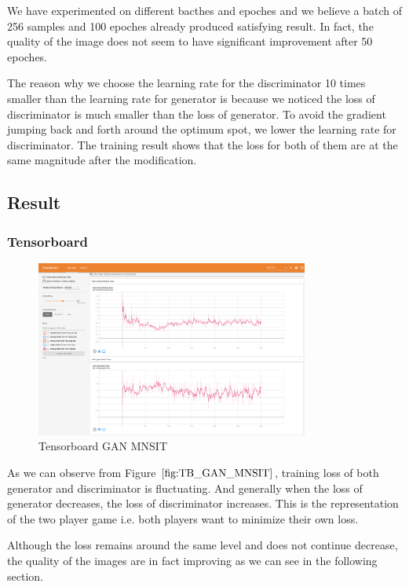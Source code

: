 \documentclass{article}
\begin{document}
We have experimented on different bacthes and epoches and we believe a batch of 256 samples and 100 epoches already produced satisfying result. 
In fact, the quality of the image does not seem to have significant improvement after 50 epoches.

The reason why we choose the learning rate for the discriminator 10 times smaller than the learning rate for generator is 
because we noticed the loss of discriminator is much smaller than the loss of generator. 
To avoid the gradient jumping back and forth around the optimum spot, we lower the learning rate for discriminator.
The training result shows that the loss for both of them are at the same magnitude after the modification.

\subsection{Result}

\subsubsection{Tensorboard}

\begin{figure}[!htb]
  \centering
  \includegraphics[width=0.8\textwidth]{tensorboard-GAN-MNIST.png}
  \caption{Tensorboard GAN MNSIT}
  \label{fig:TB_GAN_MNSIT}
\end{figure}

As we can observe from Figure $\ref{fig:TB_GAN_MNSIT}$, training loss of both generator and discriminator is fluctuating. 
And generally when the loss of generator decreases, the loss of discriminator increases. This is the representation of the two player game i.e. both players want to minimize their own loss.

Although the loss remains around the same level and does not continue decrease, the quality of the images are in fact improving as we can see in the following section.
\end{document}
